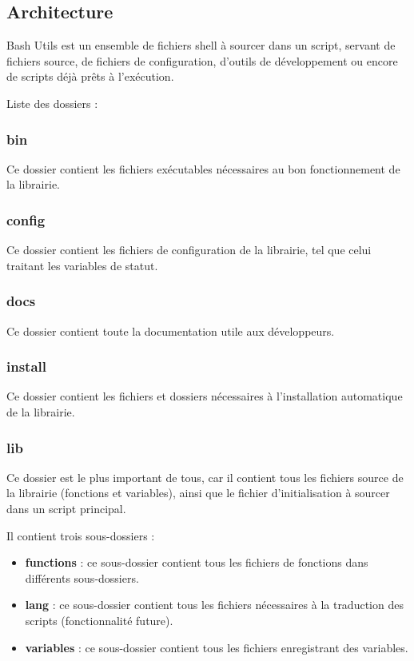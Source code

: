 \documentclass[a4paper,10pt]{article}
\begin{document}
\subsection{Architecture}
Bash Utils est un ensemble de fichiers shell à sourcer dans un script, servant de fichiers source, de fichiers de configuration, d'outils de développement ou encore de scripts déjà prêts à l'exécution.

Liste des dossiers :
\subsubsection{bin}
Ce dossier contient les fichiers exécutables nécessaires au bon fonctionnement de la librairie.

\subsubsection{config}
Ce dossier contient les fichiers de configuration de la librairie, tel que celui traitant les variables de statut.

\subsubsection{docs}
Ce dossier contient toute la documentation utile aux développeurs.

\subsubsection{install}
Ce dossier contient les fichiers et dossiers nécessaires à l'installation automatique de la librairie.

\subsubsection{lib}
Ce dossier est le plus important de tous, car il contient tous les fichiers source de la librairie (fonctions et variables), ainsi que le fichier d'initialisation à sourcer dans un script principal.

Il contient trois sous-dossiers :
\begin{itemize}
    \item \textbf{functions} : ce sous-dossier contient tous les fichiers de fonctions dans différents sous-dossiers.
    \item \textbf{lang} : ce sous-dossier contient tous les fichiers nécessaires à la traduction des scripts (fonctionnalité future).
    \item \textbf{variables} : ce sous-dossier contient tous les fichiers enregistrant des variables.
\end{itemize}
\end{document}
